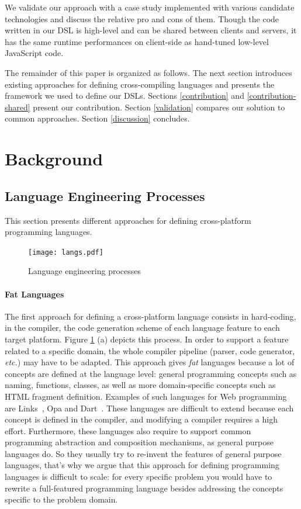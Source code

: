 \documentclass[preprint]{sigplanconf}
\newcommand{\etc}{\emph{etc.}}
\begin{document}
We validate our approach with a case study implemented with various candidate technologies and
discuss the relative pro and cons of them. Though the code written in our DSL is high-level and can
be shared between clients and servers, it has the same runtime performances on client-side as
hand-tuned low-level JavaScript code.

The remainder of this paper is organized as follows. The next section introduces existing approaches
for defining cross-compiling languages and presents the framework we used to define our DSLs.
Sections \ref{contribution} and \ref{contribution-shared} present our contribution. Section
\ref{validation} compares our solution to common approaches. Section \ref{discussion} concludes.

\section{Background}

\subsection{Language Engineering Processes}

This section presents different approaches for defining cross-platform programming languages.

\begin{figure}
\begin{center}
\texttt{[image: langs.pdf]}
\end{center}
\caption{Language engineering processes}
\label{langs}
\end{figure}

\paragraph{Fat Languages}

The first approach for defining a cross-platform language consists in hard-coding, in the compiler,
the code generation scheme of each language feature to each target platform. Figure \ref{langs} (a)
depicts this process. In order to support a feature related to a specific domain, the whole compiler
pipeline (parser, code generator, \etc) may have to be adapted. This approach gives \emph{fat}
languages because a lot of concepts are defined at the language level: general programming concepts
such as naming, functions, classes, as well as more domain-specific concepts such as HTML fragment
definition. Examples of such languages for Web programming are Links~\cite{Cooper07_Links}, Opa and
Dart~\cite{Griffith11_Dart}. These languages are difficult to extend because each concept is defined
in the compiler, and modifying a compiler requires a high effort. Furthermore, these languages also
require to support common programming abstraction and composition mechanisms, as general purpose
languages do. So they usually try to re-invent the features of general purpose languages, that’s why
we argue that this approach for defining programming languages is difficult to scale: for every
specific problem you would have to rewrite a full-featured programming language besides addressing
the concepts specific to the problem domain.
\end{document}
